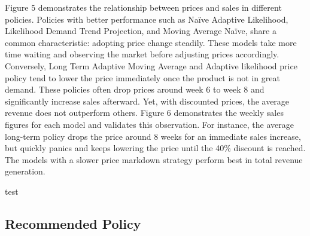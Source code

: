 \documentclass[11pt,a4paper]{article}
\begin{document}
Figure 5 demonstrates the relationship between prices and sales in different policies. 
Policies with better performance such as Naïve Adaptive Likelihood, Likelihood Demand Trend Projection, and Moving Average Naïve, share a common characteristic: adopting price change steadily. 
These models take more time waiting and observing the market before adjusting prices accordingly. 
Conversely, Long Term Adaptive Moving Average and Adaptive likelihood price policy tend to lower the price immediately once the product is not in great demand. 
These policies often drop prices around week 6 to week 8 and significantly increase sales afterward. 
Yet, with discounted prices, the average revenue does not outperform others. 
Figure 6 demonstrates the weekly sales figures for each model and validates this observation. 
For instance, the average long-term policy drops the price around 8 weeks for an immediate sales increase, but quickly panics and keeps lowering the price until the 40\% discount is reached. 
The models with a slower price markdown strategy perform best in total revenue generation. 

test


\subsection{Recommended Policy}

\pagebreak


\end{document}
